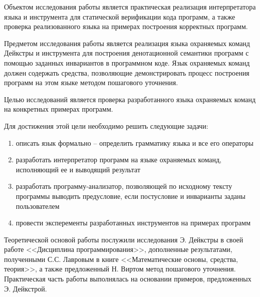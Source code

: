 Объектом исследования работы является практическая реализация интерпретатора языка и
инструмента для статической верификации кода программ, а также проверка реализованного языка на примерах построения корректных программ. 

Предметом исследования работы является реализация языка охраняемых команд Дейкстры и инструмента для построения
денотационной семантики программ с помощью заданных инвариантов в программном коде. Язык охраняемых команд 
должен содержать средства, позволяющие демонстрировать процесс построения программ на этом языке методом пошагового уточнения.


Целью исследований является проверка разработанного языка охраняемых команд на конкретных примерах программ.

Для достижения этой цели необходимо решить следующие задачи:
\begin{enumerate}
	\item описать язык формально -- определить грамматику языка и все его операторы
	\item разработать интерпретатор программ на языке охраняемых команд, исполняющий ее и выводящий результат
	\item разработать программу-анализатор, позволяющей по исходному тексту программы выводить предусловие, если постусловие и инварианты заданы пользователем
	\item провести эксперементы разработанных инструментов на примерах программ
\end{enumerate} 


Теоретической основой работы послужили исследования Э. Дейкстры 
в своей работе <<Дисциплина программирования>>\cite{Dijkstra}, дополненные результатами, полученными С.С. Лавровым в книге <<Математические основы, средства, теория>>\cite{Lavrov},
а также предложенный Н. Виртом\cite{Wirth} метод пошагового уточнения.
Практическая часть работы выполнялась на основании примеров, предложенных Э. Дейкстрой.
